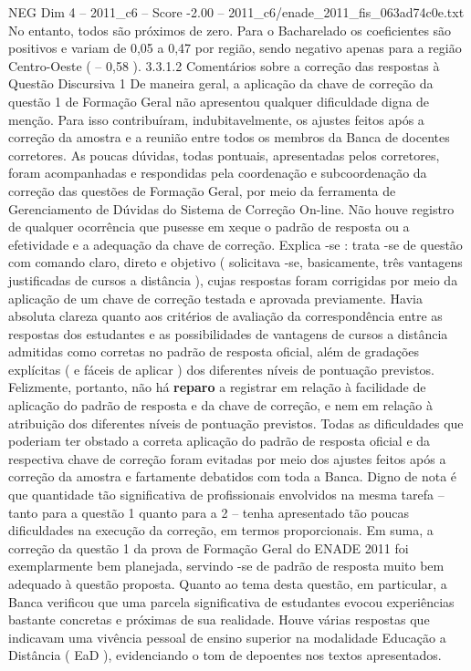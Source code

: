 \begin{textsample}{NEG Dim 4 – 2011\_c6 – Score -2.00 – 2011\_c6/enade\_2011\_fis\_063ad74c0e.txt}
No entanto, todos são próximos de zero.
Para o Bacharelado os coeficientes são positivos e variam de 0,05 a 0,47 por região, sendo negativo apenas para a região Centro-Oeste ( – 0,58 ). 3.3.1.2 Comentários sobre a correção das respostas à Questão Discursiva 1 De maneira geral, a aplicação da chave de correção da questão 1 de Formação Geral não apresentou qualquer dificuldade digna de menção.
Para isso contribuíram, indubitavelmente, os ajustes feitos após a correção da amostra e a reunião entre todos os membros da Banca de docentes corretores.
As poucas dúvidas, todas pontuais, apresentadas pelos corretores, foram acompanhadas e respondidas pela coordenação e subcoordenação da correção das questões de Formação Geral, por meio da ferramenta de Gerenciamento de Dúvidas do Sistema de Correção On-line.
Não houve registro de qualquer ocorrência que pusesse em xeque o padrão de resposta ou a efetividade e a adequação da chave de correção.
Explica -se : trata -se de questão com comando claro, direto e objetivo ( solicitava -se, basicamente, três vantagens justificadas de cursos a distância ), cujas respostas foram corrigidas por meio da aplicação de um chave de correção testada e aprovada previamente.
Havia absoluta clareza quanto aos critérios de avaliação da correspondência entre as respostas dos estudantes e as possibilidades de vantagens de cursos a distância admitidas como corretas no padrão de resposta oficial, além de gradações explícitas ( e fáceis de aplicar ) dos diferentes níveis de pontuação previstos.
Felizmente, portanto, não há \textbf{reparo} a registrar em relação à facilidade de aplicação do padrão de resposta e da chave de correção, e nem em relação à atribuição dos diferentes níveis de pontuação previstos.
Todas as dificuldades que poderiam ter obstado a correta aplicação do padrão de resposta oficial e da respectiva chave de correção foram evitadas por meio dos ajustes feitos após a correção da amostra e fartamente debatidos com toda a Banca.
Digno de nota é que quantidade tão significativa de profissionais envolvidos na mesma tarefa – tanto para a questão 1 quanto para a 2 – tenha apresentado tão poucas dificuldades na execução da correção, em termos proporcionais.
Em suma, a correção da questão 1 da prova de Formação Geral do ENADE 2011 foi exemplarmente bem planejada, servindo -se de padrão de resposta muito bem adequado à questão proposta.
Quanto ao tema desta questão, em particular, a Banca verificou que uma parcela significativa de estudantes evocou experiências bastante concretas e próximas de sua realidade.
Houve várias respostas que indicavam uma vivência pessoal de ensino superior na modalidade Educação a Distância ( EaD ), evidenciando o tom de depoentes nos textos apresentados.

\end{textsample}
